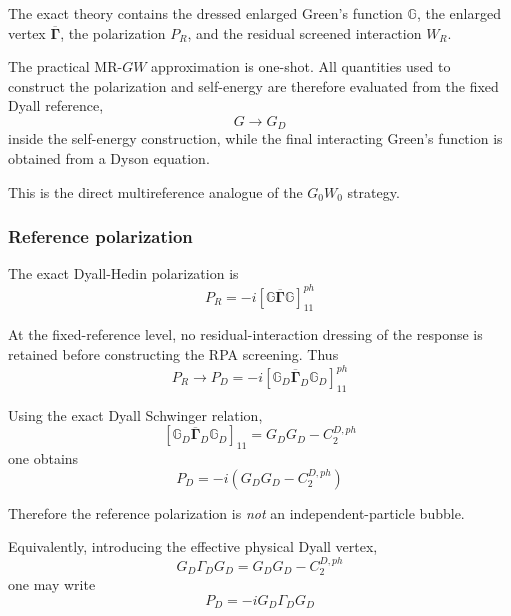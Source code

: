\documentclass[aip,jcp,reprint,noshowkeys,superscriptaddress]{revtex4-1}
\begin{document}
The exact theory contains the dressed enlarged Green's function
$\mathbb G$, the enlarged vertex $\overline{\boldsymbol\Gamma}$, the
polarization $P_R$, and the residual screened interaction $W_R$.

The practical MR-$GW$ approximation is one-shot.  All quantities used to
construct the polarization and self-energy are therefore evaluated from
the fixed Dyall reference,
\begin{equation}
  G \longrightarrow G_D
\end{equation}
inside the self-energy construction, while the final interacting Green's
function is obtained from a Dyson equation.

This is the direct multireference analogue of the $G_0W_0$ strategy.


\subsubsection{Reference polarization}

The exact Dyall-Hedin polarization is
\begin{equation}
  P_R
  =
  -i
  \left[
    \mathbb G
    \overline{\boldsymbol\Gamma}
    \mathbb G
  \right]_{11}^{ph}
  \label{eq:exact-P-task3}
\end{equation}

At the fixed-reference level, no residual-interaction dressing of the
response is retained before constructing the RPA screening.  Thus
\begin{equation}
  P_R
  \longrightarrow
  P_D
  =
  -i
  \left[
    \mathbb G_D
    \overline{\boldsymbol\Gamma}_D
    \mathbb G_D
  \right]_{11}^{ph}
  \label{eq:PR-to-PD}
\end{equation}

Using the exact Dyall Schwinger relation,
\begin{equation}
  \left[
    \mathbb G_D
    \overline{\boldsymbol\Gamma}_D
    \mathbb G_D
  \right]_{11}
  =
  G_DG_D-C_2^{D,ph}
\end{equation}
one obtains
\begin{equation}
  P_D
  =
  -i
  \left(
    G_DG_D-C_2^{D,ph}
  \right)
  \label{eq:PD-task3}
\end{equation}

Therefore the reference polarization is \emph{not} an independent-particle
bubble.

Equivalently, introducing the effective physical Dyall vertex,
\begin{equation}
  G_D\Gamma_DG_D
  =
  G_DG_D-C_2^{D,ph}
\end{equation}
one may write
\begin{equation}
  P_D
  =
  -iG_D\Gamma_DG_D
  \label{eq:PD-GammaD}
\end{equation}
\end{document}
